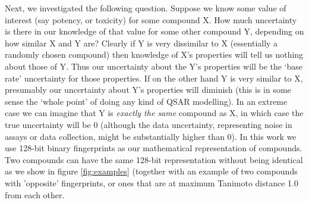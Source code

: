 \documentclass[journal=jacsat,manuscript=article]{achemso}
\begin{document}
Next, we investigated the following question. Suppose we know some value of interest (say potency, or toxicity) for some compound X.  How much uncertainty is there in our knowledge of that value for some other compound Y, depending on how similar X and Y are?
\newline
\newline
Clearly if Y is very dissimilar to X (essentially a randomly chosen compound) then knowledge of X's properties will tell us nothing about those of Y. Thus our uncertainty about the Y's properties will be the `base rate' uncertainty for those properties. If on the other hand Y is very similar to X, presumably our uncertainty about Y's properties will diminish (this is in some sense the `whole point' of doing any kind of QSAR modelling).  In an extreme case we can imagine that Y is \textit{exactly the same} compound as X, in which case the true uncertainty will be 0 (although the data uncertainty, representing noise in assays or data collection, might be substantially higher than 0).  In this work we use 128-bit binary fingerprints as our mathematical representation of compounds.  Two compounds can have the same 128-bit representation without being identical as we show in figure \ref{fig:examples} (together with an example of two compounds with 'opposite' fingerprints, or ones that are at maximum Tanimoto distance 1.0 from each other.
\end{document}
